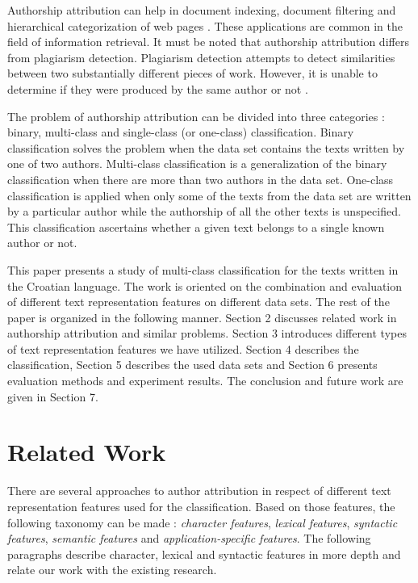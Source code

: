 \documentclass{llncs}
\begin{document}
Authorship attribution can help in document indexing, document filtering and
hierarchical categorization of web pages \cite{luyckx2005shallow}. These
applications are common in the field of information retrieval. It must be noted
that authorship attribution differs from plagiarism detection. Plagiarism
detection attempts to detect similarities between two substantially different
pieces of work. However, it is unable to determine if they were produced by the
same author or not
\cite{de2001mining}.

The problem of authorship attribution can be divided into three categories
\cite{zhao2005effective}: binary, multi-class and single-class (or one-class)
classification. Binary classification solves the problem when the data set
contains the texts written by one of two authors. Multi-class classification is a
generalization of the binary classification when there are more than two authors
in the data set. One-class classification is applied when only some of the texts
from the data set are written by a particular author while the authorship of all
the other texts is unspecified. This classification ascertains whether a given
text belongs to a single known author or not.

This paper presents a study of multi-class classification for the texts written
in the Croatian language. The work is oriented on the combination and evaluation
of different text representation features on different data sets. The rest of
the paper is organized in the following manner. Section 2 discusses related work in authorship attribution
and similar problems. Section 3 introduces different types of text representation
features we have utilized. Section 4 describes the classification, Section 5
describes the used data sets and Section 6 presents evaluation methods and
experiment results. The conclusion and future work are given in Section 7.

\section{Related Work}
There are several approaches to author attribution in respect of different text
representation features used for the classification. Based on those features, the
following taxonomy can be made \cite{stamatatos2009survey}: \emph{character
features}, \emph{lexical features}, \emph{syntactic features}, \emph{semantic
features} and \emph{application-specific features}. The following paragraphs
describe character, lexical and syntactic features in more depth and relate our
work with the existing research.
\end{document}
